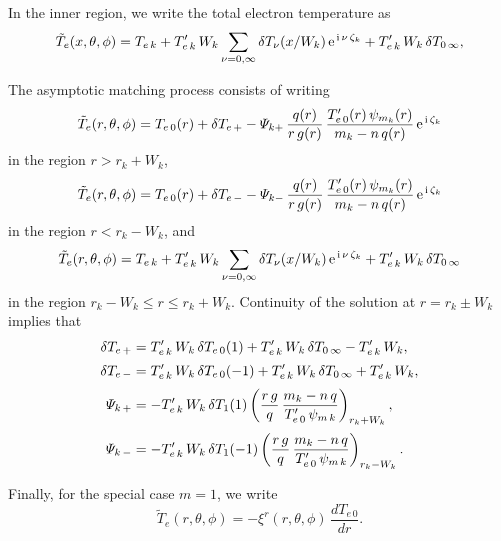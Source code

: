 \documentclass[12pt,prb,aps,notitlepage]{revtex4-1}
\begin{document}
In the inner region, we write the total electron temperature as 
\begin{equation}
\tilde{T}_e(x, \theta,\phi)=T_{e\,k} +T_{e\,k}'\,W_k\sum_{\nu=0,\infty}\delta T_\nu(x/W_k)\,{\rm e}^{\,{\rm i}\,\nu\,\zeta_k}+T_{e\,k}'\,W_k\,\delta T_{0\,\infty},
\end{equation}

The asymptotic matching process consists of writing
\begin{equation}
\tilde{T}_e(r,\theta,\phi) = T_{e\,0}(r) + \delta T_{e\,+} - {\mit\Psi}_{k+}\,\frac{q(r)}{r\,g(r)}\,\frac{T_{e\,0}'(r)\,\psi_{m_k}(r)}{m_k-n\,q(r)}\,{\rm e}^{\,{\rm i}\,\zeta_k}
\end{equation}
in the region $r>r_k+W_k$, 
\begin{equation}
\tilde{T}_e(r,\theta,\phi) = T_{e\,0}(r) + \delta T_{e\,-} - {\mit\Psi}_{k-}\,\frac{q(r)}{r\,g(r)}\,\frac{T_{e\,0}'(r)\,\psi_{m_k}(r)}{m_k-n\,q(r)}\,{\rm e}^{\,{\rm i}\,\zeta_k}
\end{equation}
in the region $r< r_k-W_k$, and 
\begin{equation}
\tilde{T}_e(r, \theta,\phi)=T_{e\,k} +T_{e\,k}'\,W_k\sum_{\nu=0,\infty}\delta T_\nu(x/W_k)\,{\rm e}^{\,{\rm i}\,\nu\,\zeta_k}+T_{e\,k}'\,W_k\,\delta T_{0\,\infty}
\end{equation}
in the region $r_k-W_k \leq r\leq r_k+W_k$. Continuity of the solution at $r=r_k\pm W_k$ implies that
\begin{align}
\delta T_{e\,+} &= T_{e\,k}'\,W_k\,\delta T_{e\,0}(1)+T_{e\,k}'\,W_k\,\delta T_{0\,\infty} - T_{e\,k}'\,W_k,\\[0.5ex]
\delta T_{e\,-} &= T_{e\,k}'\,W_k\,\delta T_{e\,0}(-1) +T_{e\,k}'\,W_k\,\delta T_{0\,\infty}+ T_{e\,k}'\,W_k,\\[0.5ex]
{\mit\Psi}_{k\,+} &= - T_{e\,k}'\,W_k\,\delta T_1(1)\left(\frac{r\,g}{q}\,\frac{m_k-n\,q}{T_{e\,0}'\,\psi_{m\,k}}\right)_{r_k+W_k},\\[0.5ex]
{\mit\Psi}_{k\,-} &=- T_{e\,k}'\,W_k\,\delta T_1(-1)\left(\frac{r\,g}{q}\,\frac{m_k-n\,q}{T_{e\,0}'\,\psi_{m\,k}}\right)_{r_k-W_k}.
\end{align}

Finally, for the special case $m=1$, we write
\begin{equation}
\tilde{T}_e(r,\theta,\phi) = - \xi^r(r,\theta,\phi)\,\frac{dT_{e\,0}}{dr}.
\end{equation}
\end{document}
